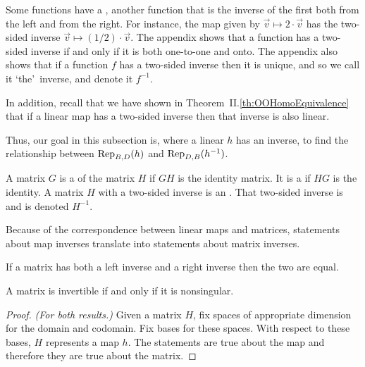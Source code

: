 Some functions have a 
, 
another function
that is the inverse of the first both from the left and from the right.
For instance, the map given by 
$\vec{v}\mapsto 2\cdot \vec{v}$ has the two-sided inverse 
$\vec{v}\mapsto (1/2)\cdot\vec{v}$.  
% 
The appendix shows that a function
has a two-sided inverse if and only if it is both one-to-one and onto.
The appendix also shows that if a function $f$ has a two-sided inverse then 
it is unique, and so we call it 
`the'~inverse,
and denote it $f^{-1}$.

In addition, recall that we have shown in Theorem~II.\ref{th:OOHomoEquivalence}
that if a linear map has a two-sided inverse
then that inverse is also linear. 

Thus, our goal in this subsection is, where a linear $h$ has an inverse,
to find the relationship between $\rep{h}{B,D}$ and $\rep{h^{-1}}{D,B}$.

\begin{definition}
A matrix \( G \) is a 
of the matrix \( H \) if \( GH \) is the identity matrix.
It is a 
if \( HG \) is the identity.
A matrix $H$ with a two-sided inverse is an .
That two-sided inverse is
 and
is denoted \( H^{-1} \).
\end{definition}

Because of the correspondence between linear maps and matrices,
statements about map inverses translate into statements about matrix inverses.

\begin{lemma}     \label{le:LeftAndRightInvEqual}
If a matrix has both a left inverse and a right inverse then the two are equal.
\end{lemma}

\begin{theorem}
A matrix is invertible if and only if it is nonsingular.
\end{theorem}

\begin{proof}
\textit{(For both results.)}
Given a matrix $H$, fix spaces of appropriate dimension for the domain
and codomain.
Fix bases for these spaces.
With respect to these bases, $H$ represents a map $h$.
The statements are true about the map and therefore they are true about the
matrix.
\end{proof}

